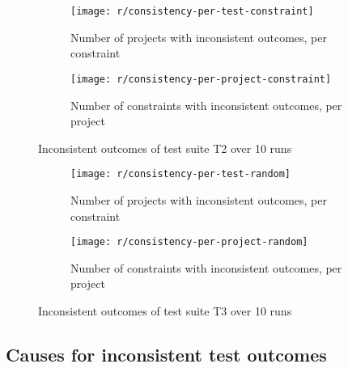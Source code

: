 \begin{figure}[htpb]
    \centering
    \begin{subfigure}{.75\textwidth}
        \texttt{[image: r/consistency-per-test-constraint]}%
        \vspace{-\medskipamount}
        \caption{Number of projects with inconsistent outcomes, per constraint}
        \label{fig:consistency_per_test_constraint}
    \end{subfigure}

    \bigskip

    \begin{subfigure}{.75\textwidth}
        \texttt{[image: r/consistency-per-project-constraint]}%
        \vspace{-\medskipamount}
        \caption{Number of constraints with inconsistent outcomes, per project}
        \label{fig:consistency_per_project_constraint}
    \end{subfigure}

    \caption{Inconsistent outcomes of test suite T2 over 10 runs}
    \label{fig:consistency_constraint}
\end{figure}

\begin{figure}[htpb]
    \centering
    \begin{subfigure}{.75\textwidth}
        \texttt{[image: r/consistency-per-test-random]}%
        \vspace{-\medskipamount}
        \caption{Number of projects with inconsistent outcomes, per constraint}
        \label{fig:consistency_per_test_random}
    \end{subfigure}

    \bigskip

    \begin{subfigure}{.75\textwidth}
        \texttt{[image: r/consistency-per-project-random]}%
        \vspace{-\medskipamount}
        \caption{Number of constraints with inconsistent outcomes, per project}
        \label{fig:consistency_per_project_random}
    \end{subfigure}

    \caption{Inconsistent outcomes of test suite T3 over 10 runs}
    \label{fig:consistency_random}
\end{figure}

\subsection{Causes for inconsistent test outcomes}

